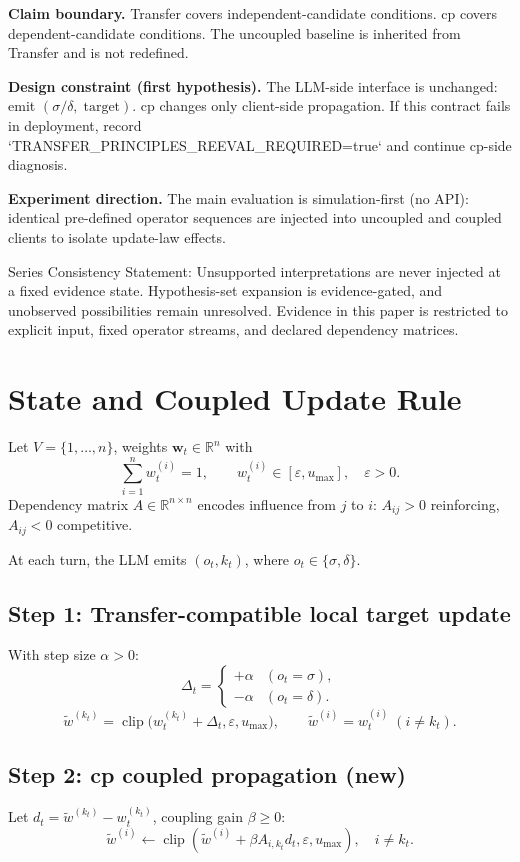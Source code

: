 \documentclass[11pt,a4paper]{article}
\begin{document}
\textbf{Claim boundary.}
Transfer covers independent-candidate conditions. cp covers dependent-candidate conditions. The uncoupled baseline is inherited from Transfer and is not redefined.

\textbf{Design constraint (first hypothesis).}
The LLM-side interface is unchanged: emit \((\sigma/\delta,\;\text{target})\). cp changes only client-side propagation. If this contract fails in deployment, record `TRANSFER\_PRINCIPLES\_REEVAL\_REQUIRED=true` and continue cp-side diagnosis.

\textbf{Experiment direction.}
The main evaluation is simulation-first (no API): identical pre-defined operator sequences are injected into uncoupled and coupled clients to isolate update-law effects.

Series Consistency Statement: Unsupported interpretations are never injected at a fixed evidence state. Hypothesis-set expansion is evidence-gated, and unobserved possibilities remain unresolved. Evidence in this paper is restricted to explicit input, fixed operator streams, and declared dependency matrices.

\section{State and Coupled Update Rule}
Let \(V=\{1,\dots,n\}\), weights \(\mathbf{w}_t\in\mathbb{R}^n\) with
\[
\sum_{i=1}^{n} w_t^{(i)}=1,\qquad w_t^{(i)}\in[\varepsilon,u_{\max}],\quad \varepsilon>0.
\]
Dependency matrix \(A\in\mathbb{R}^{n\times n}\) encodes influence from \(j\) to \(i\): \(A_{ij}>0\) reinforcing, \(A_{ij}<0\) competitive.

At each turn, the LLM emits \((o_t,k_t)\), where \(o_t\in\{\sigma,\delta\}\).

\subsection{Step 1: Transfer-compatible local target update}
With step size \(\alpha>0\):
\[
\Delta_t = \begin{cases}
+\alpha & (o_t=\sigma),\\
-\alpha & (o_t=\delta).
\end{cases}
\]
\[
\tilde{w}^{(k_t)}=\operatorname{clip}\big(w_t^{(k_t)}+\Delta_t,\varepsilon,u_{\max}\big),\qquad
\tilde{w}^{(i)}=w_t^{(i)}\;(i\neq k_t).
\]

\subsection{Step 2: cp coupled propagation (new)}
Let \(d_t=\tilde{w}^{(k_t)}-w_t^{(k_t)}\), coupling gain \(\beta\ge 0\):
\[
\tilde{w}^{(i)} \leftarrow \operatorname{clip}\left(\tilde{w}^{(i)}+\beta A_{i,k_t}d_t,\varepsilon,u_{\max}\right),\quad i\neq k_t.
\]
\end{document}
